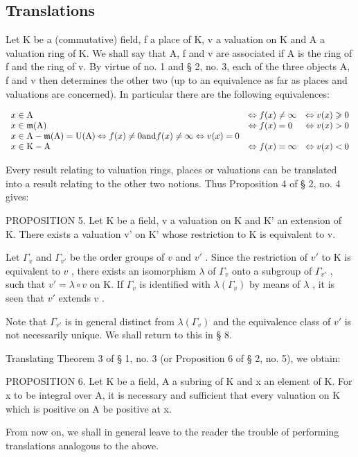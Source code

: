 \subsection{Translations}

Let K be a (commutative) field, f a place of K, v a valuation on K and A a valuation ring of K. We shall say that A, f and v are associated if A is the ring of f and the ring of v. By virtue of no. 1 and § 2, no. 3, each of the three objects A, f and v then determines the other two (up to an equivalence as far as places and valuations are concerned). In particular there are the following equivalences:

\[
\begin{array}{l l l l} x \in \mathrm{A} & \Leftrightarrow f (x) \neq \infty & \Leftrightarrow v (x) \geqslant 0 \\ x \in \mathfrak {m} (\mathrm{A}) & \Leftrightarrow f (x) = 0 & \Leftrightarrow v (x) > 0 \\ x \in \mathrm{A} - \mathfrak {m} (\mathrm{A}) = \mathrm{U} (\mathrm{A}) \Leftrightarrow f (x) \neq 0 \text {and} f (x) \neq \infty \Leftrightarrow v (x) = 0 \\ x \in \mathrm{K} - \mathrm{A} & \Leftrightarrow f (x) = \infty & \Leftrightarrow v (x) <   0 \end{array}
\]

Every result relating to valuation rings, places or valuations can be translated into a result relating to the other two notions. Thus Proposition 4 of § 2, no. 4 gives:

PROPOSITION 5. Let K be a field, v a valuation on K and K' an extension of K. There exists a valuation v' on K' whose restriction to K is equivalent to v.

Let \(\Gamma_v\) and \(\Gamma_{v'}\) be the order groups of \(v\) and \(v'\) . Since the restriction of \(v'\) to K is equivalent to \(v\) , there exists an isomorphism \(\lambda\) of \(\Gamma_v\) onto a subgroup of \(\Gamma_{v'}\) , such that \(v' = \lambda \circ v\) on K. If \(\Gamma_v\) is identified with \(\lambda(\Gamma_v)\) by means of \(\lambda\) , it is seen that \(v'\) extends \(v\) .

Note that \(\Gamma_{v'}\) is in general distinct from \(\lambda(\Gamma_v)\) and the equivalence class of \(v'\) is not necessarily unique. We shall return to this in § 8.

Translating Theorem 3 of § 1, no. 3 (or Proposition 6 of § 2, no. 5), we obtain:

PROPOSITION 6. Let K be a field, A a subring of K and x an element of K. For x to be integral over A, it is necessary and sufficient that every valuation on K which is positive on A be positive at x.

From now on, we shall in general leave to the reader the trouble of performing translations analogous to the above.

